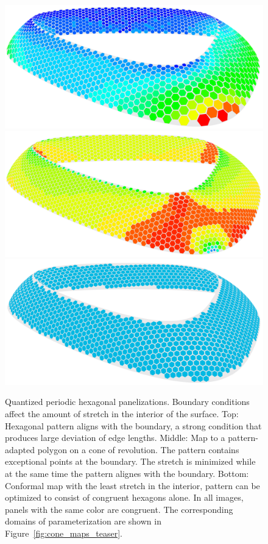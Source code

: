 \documentclass[article.tex]{subfiles}
\begin{document}
\begin{figure}[p]
  \centering
  \includegraphics[width=.89\textwidth]{images/quantized_aligned4.png}
  \includegraphics[width=.89\textwidth]{images/quantized_singularities3.png}
  \includegraphics[width=.89\textwidth]{images/quantized_isometric2.png}
  \caption{Quantized periodic hexagonal panelizations. Boundary
    conditions affect the amount of stretch in the interior of the
    surface. Top: Hexagonal pattern aligns with the boundary, a strong
    condition that produces large deviation of edge lengths. Middle:
    Map to a pattern-adapted polygon on a cone of revolution. The
    pattern contains exceptional points at the boundary. The stretch
    is minimized while at the same time the pattern alignes with the
    boundary.  Bottom: Conformal map with the least stretch in the
    interior, pattern can be optimized to consist of congruent
    hexagons alone. In all images, panels with the same color are
    congruent. The corresponding domains of parameterization are shown
    in Figure~\ref{fig:cone_maps_teaser}.}
  \label{fig:hex_example}
\end{figure}
\end{document}
